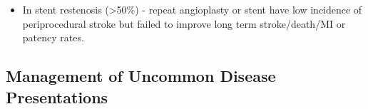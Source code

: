 \documentclass[
]{book}
\providecommand{\tightlist}{%
  \setlength{\itemsep}{0pt}\setlength{\parskip}{0pt}}
\begin{document}
\begin{itemize}
  \begin{itemize}
  \tightlist
  \item
    In stent restenosis (\textgreater50\%) - repeat angioplasty or stent have
    low incidence of periprocedural stroke but failed to improve
    long term stroke/death/MI or patency rates.
    \citep{chungPercutaneousInterventionCarotid2016a}
  \end{itemize}
\end{itemize}

\hypertarget{management-of-uncommon-disease-presentations}{%
\subsection{Management of Uncommon Disease Presentations}\label{management-of-uncommon-disease-presentations}}
\end{document}
